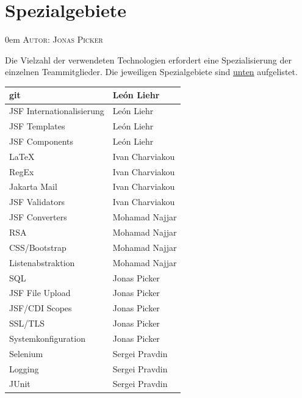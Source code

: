 \documentclass{article}
\makeatletter
\newcommand{\sectionauthor}[1]{
	{\parindent 0em \large \scshape Autor: #1 \par \nobreak \vspace*{1em}}
	\@afterheading
}
\makeatother
\begin{document}
\section{Spezialgebiete}
\sectionauthor{Jonas Picker}
Die Vielzahl der verwendeten Technologien erfordert eine Spezialisierung der einzelnen Teammitglieder. Die jeweiligen Spezialgebiete sind \hyperlink{speziell}{unten} aufgelistet.
\begin{table}[H]
\centering
\hypertarget{speziell}{}
\begin{tabular}{| p{6cm} | p{6cm} |}
	\hline
     	git & León Liehr \\
     	\hline
     	JSF Internationalisierung & León Liehr \\
     	\hline
    	JSF Templates & León Liehr \\
     	\hline
     	JSF Components & León Liehr \\
     	\hline
     	\hline
     	LaTeX & Ivan Charviakou \\
     	\hline
     	RegEx & Ivan Charviakou \\
     	\hline
     	Jakarta Mail & Ivan Charviakou \\
     	\hline
     	JSF Validators & Ivan Charviakou \\
     	\hline
     	\hline
     	JSF Converters & Mohamad Najjar \\
    	\hline
    	 RSA & Mohamad Najjar \\
    	\hline
    	 CSS/Bootstrap & Mohamad Najjar \\
     	\hline
     	Listenabstraktion & Mohamad Najjar \\
     	\hline
     	\hline
     	SQL & Jonas Picker \\
    	\hline
    	JSF File Upload & Jonas Picker \\
     	\hline
     	JSF/CDI Scopes & Jonas Picker \\
     	\hline
     	SSL/TLS & Jonas Picker \\
     	\hline
     	Systemkonfiguration & Jonas Picker \\
     	\hline
     	\hline
     	Selenium & Sergei Pravdin \\
     	\hline
     	Logging & Sergei Pravdin \\
     	\hline
     	JUnit & Sergei Pravdin \\
     	\hline
\end{tabular}
\end{table}
\newpage

\end{document}
